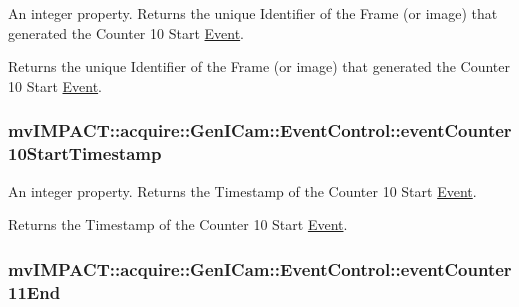 An integer property. Returns the unique Identifier of the Frame (or image) that generated the Counter 10 Start \hyperlink{classmv_i_m_p_a_c_t_1_1acquire_1_1_event}{Event}. 

Returns the unique Identifier of the Frame (or image) that generated the Counter 10 Start \hyperlink{classmv_i_m_p_a_c_t_1_1acquire_1_1_event}{Event}. \hypertarget{classmv_i_m_p_a_c_t_1_1acquire_1_1_gen_i_cam_1_1_event_control_acc628cd17e1ade355bdf07709564d547}{
\subsubsection[{event\+Counter10\+Start\+Timestamp}]{ mv\+I\+M\+P\+A\+C\+T\+::acquire\+::\+Gen\+I\+Cam\+::\+Event\+Control\+::event\+Counter10\+Start\+Timestamp}}\label{classmv_i_m_p_a_c_t_1_1acquire_1_1_gen_i_cam_1_1_event_control_acc628cd17e1ade355bdf07709564d547}


An integer property. Returns the Timestamp of the Counter 10 Start \hyperlink{classmv_i_m_p_a_c_t_1_1acquire_1_1_event}{Event}. 

Returns the Timestamp of the Counter 10 Start \hyperlink{classmv_i_m_p_a_c_t_1_1acquire_1_1_event}{Event}. \hypertarget{classmv_i_m_p_a_c_t_1_1acquire_1_1_gen_i_cam_1_1_event_control_a7a505f7c426c3c2033e7db5cde8b88b5}{
\subsubsection[{event\+Counter11\+End}]{ mv\+I\+M\+P\+A\+C\+T\+::acquire\+::\+Gen\+I\+Cam\+::\+Event\+Control\+::event\+Counter11\+End}}\label{classmv_i_m_p_a_c_t_1_1acquire_1_1_gen_i_cam_1_1_event_control_a7a505f7c426c3c2033e7db5cde8b88b5}


